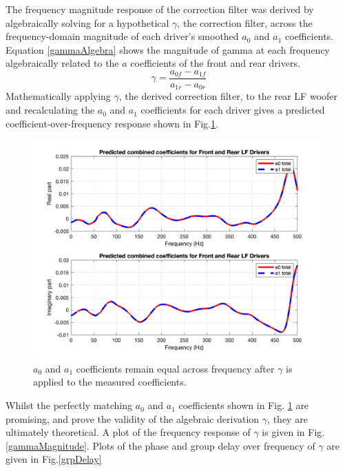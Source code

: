 \documentclass{report}
\begin{document}
            The frequency magnitude response of the correction filter was derived by algebraically solving for a hypothetical $\gamma$, the correction filter, across the frequency-domain magnitude of each driver's smoothed $a_0$ and $a_1$ coefficients.
            Equation \ref{gammaAlgebra} shows the magnitude of gamma at each frequency algebraically related to the $a$ coefficients of the front and rear drivers.
            \begin{equation}
                \gamma = \frac{a_{0f} - a_{1f}}{a_{1r} - a_{0r}}
                \label{gammaAlgebra}
            \end{equation}
            Mathematically applying $\gamma$, the derived correction filter, to the rear LF woofer and recalculating the $a_0$ and $a_1$ coefficients for each driver gives a predicted coefficient-over-frequency response shown in Fig.\ref{coeffsPredicted}.
            \begin{figure}[H]
                \centering
                \includegraphics[scale=0.35]{figs/coeffsPredicted.png}%
                \caption{$a_0$ and $a_1$ coefficients remain equal across frequency after $\gamma$ is applied to the measured coefficients.}
                \label{coeffsPredicted}
            \end{figure}
            Whilst the perfectly matching $a_0$ and $a_1$ coefficients shown in Fig. \ref{coeffsPredicted} are promising, and prove the validity of the algebraic derivation $\gamma$, they are ultimately theoretical.
            A plot of the frequency response of $\gamma$ is given in Fig.\ref{gammaMagnitude}.
            Plots of the phase and group delay over frequency of $\gamma$ are given in Fig.\ref{grpDelay}
\end{document}

